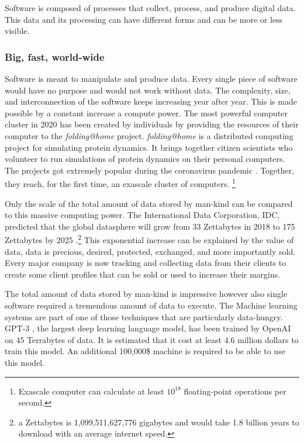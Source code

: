 \documentclass[manuscript,screen]{acmart}
\begin{document}
Software is composed of processes that collect, process, and produce digital data. 
This data and its processing can have different forms and can be more or less visible. 


\subsubsection{Big, fast, world-wide}

Software is meant to manipulate and produce data. Every single piece of software would have no purpose and would not work without data.
The complexity, size, and interconnection of the software keeps increasing year after year. 
This is made possible by a constant increase a compute power.
The most powerful computer cluster in 2020 has been created by individuals by providing the resources of their computer to the \textit{folding@home} project. \textit{folding@home} is a distributed computing project for simulating protein dynamics. It brings together citizen scientists who volunteer to run simulations of protein dynamics on their personal computers. The projects got extremely popular during the coronavirus pandemic \cite{zimmerman2020sars}.
Together, they reach, for the first time, an exascale cluster of computers. \footnote{Exascale computer can calculate at least $10^{18}$ floating-point operations per second.} 

Only the scale of the total amount of data stored by man-kind can be compared to this massive computing power. 
The International Data Corporation, IDC, predicted that the global datasphere will grow from 33 Zettabytes in 2018 to 175 Zettabytes by 2025 \cite{rydning2018digitization}.\footnote{a Zettabytes is 1,099,511,627,776 gigabytes and would take 1.8 billion years to download with an average internet speed.}
This exponential increase can be explained by the value of data, data is precious, desired, protected, exchanged, and more importantly sold. 
Every major company is now tracking and collecting data from their clients to create some client profiles that can be sold or used to increase their margins.

The total amount of data stored by man-kind is impressive however also single software required a tremendous amount of data to execute. The Machine learning systems are part of one of those techniques that are particularly data-hungry.
GPT-3 \cite{brown2020language}, the largest deep learning language model, has been trained by OpenAI on 45 Terrabytes of data. It is estimated \cite{GPT3Overview} that it cost at least 4.6 million dollars to train this model. 
An additional 100,000\$ machine is required to be able to use this model.
\end{document}
